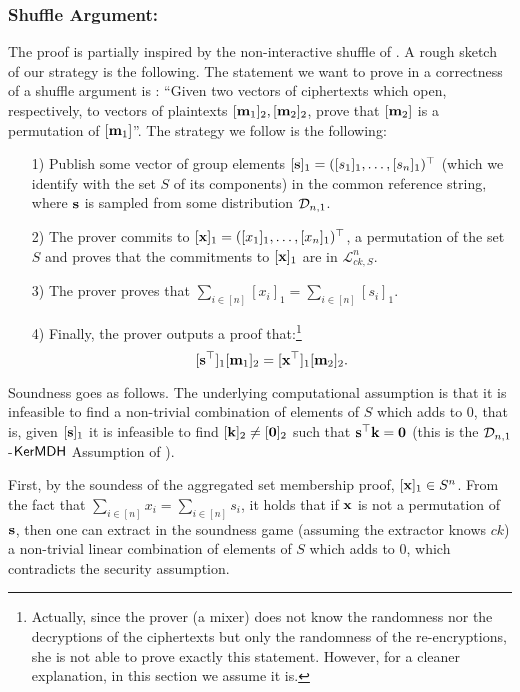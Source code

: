   \subsubsection{Shuffle Argument:} The proof is partially inspired by the non-interactive shuffle of \cite{AC:GroLu07}. A rough sketch of our strategy is the following. The statement we want to prove in a correctness of a shuffle argument is : ``Given two vectors of ciphertexts which open, respectively, to vectors of plaintexts $[\mathbf{m}_1]_2, [\mathbf{m}_2]_2$, prove that 
 $[\mathbf{m}_2]$ is a permutation of $[\mathbf{m}_1]$''. 
The strategy we follow is the following:  
\begin{itemize}
\item[1)] Publish some vector of group elements $[\mathbf{s}]_1 =([s_1]_1,\ldots,[s_n]_1)^\top$ (which we identify with the set $S$ of its components) in the common reference string, where $\mathbf{s}$ is sampled from some distribution $\mathcal{D}_{n,1}$.
\item[2)] The prover commits to $[\mathbf{x}]_1=([x_1]_1,\ldots,[x_n]_1)^\top$, a permutation of the set $S$ and proves that the commitments to $[\mathbf{x}]_1$ are in $\mathcal{L}^{n}_{ck,S}$.
\item[3)] The prover proves that $\sum_{i \in [n]} [x_i]_1 =\sum_{i \in [n]} [s_i]_1$.
\item[4)] Finally, the prover outputs a proof that:\footnote{Actually, since the prover (a mixer) does not know the randomness nor the decryptions of the ciphertexts but only the randomness of the re-encryptions, she is not able to prove exactly this statement. However, for a cleaner explanation, in this section we assume it is.} 
\begin{equation}\label{shuffle:ker}[\mathbf{s}^{\top}]_1 [\mathbf{m}_1]_2 =[\mathbf{x}^{\top}]_1 [\mathbf{m}_2]_2.
\end{equation}
\end{itemize}
Soundness goes as follows. The underlying computational assumption is that it is infeasible to find a non-trivial combination of elements of $S$ which adds to $0$, that is, given $[\mathbf{s}]_1$ it is infeasible to find $[\mathbf{k}]_2 \neq [\mathbf{0}]_2$ such that
$\mathbf{s}^{\top} \mathbf{k}=\mathbf{0}$ (this is the $\mathcal{D}_{n,1}$-$\mathsf{KerMDH}$ Assumption of \cite{EPRINT:MorRafVil15}). 
 
First, by the soundess of the aggregated set membership proof, $[\mathbf{x}]_1 \in S^{n}$. From the fact that 
 $\sum_{i \in [n]} x_i =\sum_{i \in [n]} s_i$, it holds that if 
 $\mathbf{x}$ is not a permutation of $\mathbf{s}$, then one can extract in the soundness game (assuming the extractor knows $ck$) a non-trivial linear combination of elements of $S$ which adds to $0$, which contradicts the security assumption. 
 
